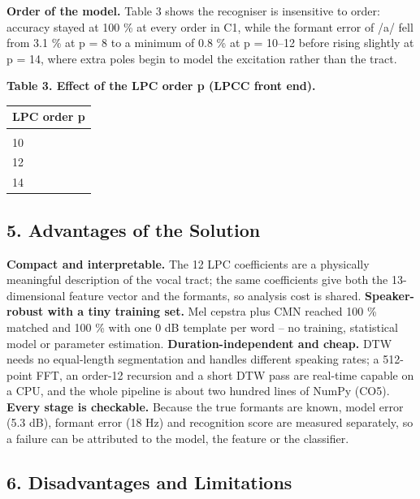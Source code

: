 \documentclass[
]{article}
\newcounter{none} %
\begin{document}
\textbf{Order of the model.} Table 3 shows the recogniser is insensitive
to order: accuracy stayed at 100 \% at every order in C1, while the
formant error of /a/ fell from 3.1 \% at p = 8 to a minimum of 0.8 \% at
p = 10--12 before rising slightly at p = 14, where extra poles begin to
model the excitation rather than the tract.

\textbf{Table 3. Effect of the LPC order p (LPCC front end).}

{\def\LTcaptype{none} %
\begin{longtable}[]{@{}l@{}}
\toprule\noalign{}
LPC order p \\
\midrule\noalign{}
\endhead
\bottomrule\noalign{}
\endlastfoot
8 \\
10 \\
12 \\
14 \\
\end{longtable}
}

\subsection{5. Advantages of the
Solution}\label{5-advantages-of-the-solution}

\textbf{Compact and interpretable.} The 12 LPC coefficients are a
physically meaningful description of the vocal tract; the same
coefficients give both the 13-dimensional feature vector and the
formants, so analysis cost is shared. \textbf{Speaker-robust with a tiny
training set.} Mel cepstra plus CMN reached 100 \% matched and 100 \%
with one 0 dB template per word -- no training, statistical model or
parameter estimation. \textbf{Duration-independent and cheap.} DTW needs
no equal-length segmentation and handles different speaking rates; a
512-point FFT, an order-12 recursion and a short DTW pass are real-time
capable on a CPU, and the whole pipeline is about two hundred lines of
NumPy (CO5). \textbf{Every stage is checkable.} Because the true
formants are known, model error (5.3 dB), formant error (18 Hz) and
recognition score are measured separately, so a failure can be
attributed to the model, the feature or the classifier.

\subsection{6. Disadvantages and
Limitations}\label{6-disadvantages-and-limitations}
\end{document}
